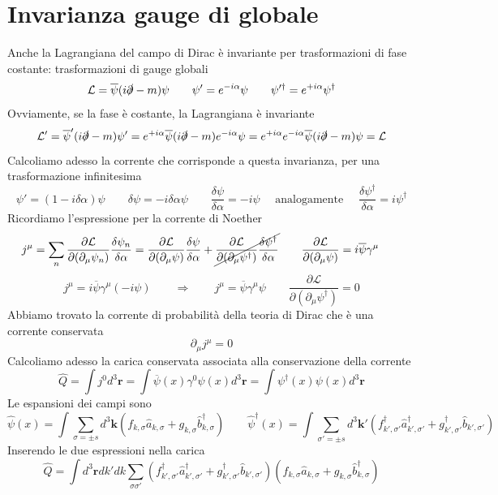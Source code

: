 \section{Invarianza gauge di globale}
Anche la Lagrangiana del campo di Dirac è invariante per trasformazioni di fase costante: trasformazioni di gauge globali
$$
\mathcal{L} = \overline{\psi}(i\slashed{\partial} - m)\psi \qquad \psi' = e^{-i\alpha}\psi \qquad \psi'^\dagger = e^{+i\alpha}\psi^\dagger
$$
Ovviamente, se la fase è costante, la Lagrangiana è invariante
$$
\mathcal{L}' = \overline{\psi}'(i\slashed{\partial} - m)\psi' = e^{+i\alpha}\overline{\psi}(i\slashed{\partial} - m)e^{-i\alpha}\psi = e^{+i\alpha}e^{-i\alpha}\overline{\psi}(i\slashed{\partial} - m)\psi = \mathcal{L}
$$
Calcoliamo adesso la corrente che corrisponde a questa invarianza, per una trasformazione infinitesima
$$
\psi' = (1 - i\delta\alpha)\psi \qquad \delta\psi = -i\delta\alpha\psi \qquad \frac{\delta\psi}{\delta\alpha} = -i\psi \quad \text{ analogamente }\quad\frac{\delta\psi^\dagger}{\delta\alpha} = i\psi^\dagger
$$
Ricordiamo l'espressione per la corrente di Noether
$$
j^\mu = \sum_n \frac{\partial\mathcal{L}}{\partial(\partial_\mu\psi_n)} \frac{\delta\psi_n}{\delta\alpha} = \frac{\partial\mathcal{L}}{\partial(\partial_\mu\psi)} \frac{\delta\psi}{\delta\alpha} + \cancel{\frac{\partial\mathcal{L}}{\partial(\partial_\mu\psi^\dagger)} \frac{\delta\psi^\dagger}{\delta\alpha}} \qquad \frac{\partial\mathcal{L}}{\partial(\partial_\mu\psi)} = i\overline{\psi}\gamma^\mu \qquad 
$$
$$
j^\mu = i\overline{\psi}\gamma^\mu (-i\psi)\qquad \Longrightarrow\qquad j^\mu = \overline{\psi}\gamma^\mu\psi \qquad \frac{\partial\mathcal{L}}{\partial(\partial_\mu\psi^\dagger)} = 0
$$
Abbiamo trovato la corrente di probabilità della teoria di Dirac che è una corrente conservata
$$
\partial_\mu j^\mu = 0
$$
Calcoliamo adesso la carica conservata associata alla conservazione della corrente
$$
\hat{Q} = \int j^0 d^3\mathbf{r} = \int \overline{\psi}(x)\gamma^0\psi(x) d^3\mathbf{r} = \int \psi^\dagger(x)\psi(x) d^3\mathbf{r}
$$
Le espansioni dei campi sono
$$
\hat{\psi}(x) = \int \sum_{\sigma=\pm s} d^3\mathbf{k} (f_{k,\sigma} \hat{a}_{k,\sigma} + g_{k,\sigma} \hat{b}_{k,\sigma}^\dagger) \qquad \hat{\psi}^\dagger(x) = \int \sum_{\sigma'=\pm s} d^3\mathbf{k}' (f_{k',\sigma'}^\dagger \hat{a}_{k',\sigma'}^\dagger + g_{k',\sigma'}^\dagger \hat{b}_{k',\sigma'})
$$
Inserendo le due espressioni nella carica
$$
\hat{Q} = \int d^3\mathbf{r} dk' dk \sum_{\sigma\sigma'} (f_{k',\sigma'}^\dagger \hat{a}_{k',\sigma'}^\dagger + g_{k',\sigma'}^\dagger \hat{b}_{k',\sigma'}) (f_{k,\sigma} \hat{a}_{k,\sigma} + g_{k,\sigma} \hat{b}_{k,\sigma}^\dagger)
$$
